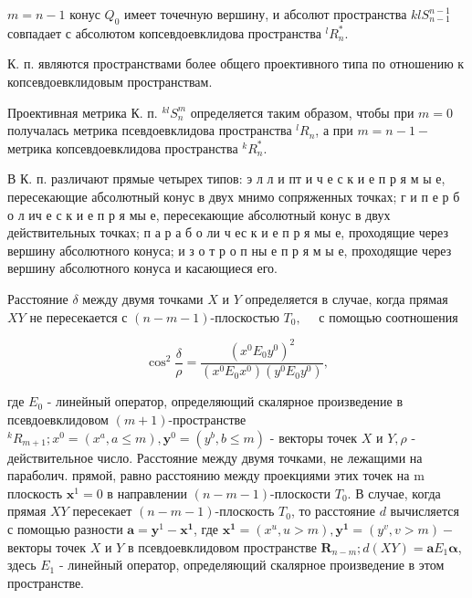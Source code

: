 \documentclass[10pt]{article}
\begin{document}
$m=n-1$ конус $Q_{0}$ имеет точечную вершину, и абсолют пространства $k l S_{n-1}^{n-1}$ совпадает с абсолютом копсевдоевклидова пространства ${ }^{l} R_{n}^{*}$.



К. п. являются пространствами более общего проективного типа по отношению к копсевдоевклидовым пространствам.



Проективная метрика К. п. ${ }^{k l} S_{n}^{m}$ определяется таким образом, чтобы при $m=0$ получалась метрика псевдоевклидова пространства ${ }^{l} R_{n}$, а при $m=n-1-$ метрика копсевдоевклидова пространства ${ }^{k} R_{n}^{*}$.



В К. п. различают прямые четырех типов: э л л и пт и ч е с к и е п р я м ы е, пересекающие абсолютный конус в двух мнимо сопряженных точках; г и п е р б о л ич е с к и е п р я мы е, пересекающие абсолютный конус в двух действительных точках; п а р а б о ли ч ес к и е п р я мы е, проходящие через вершину абсолютного конуса; и з о т р о п ны е п р я м ы е, проходящие через вершину абсолютного конуса и касающиеся его.



Расстояние $\delta$ между двумя точками $X$ и $Y$ определяется в случае, когда прямая $X Y$ не пересекается с $(n-m-1)$-плоскостью $T_{0}, \quad$ с помощью соотношения



\[

\cos ^{2} \frac{\delta}{\rho}=\frac{\left(x^{0} E_{0} y^{0}\right)^{2}}{\left(x^{0} E_{0} x^{0}\right)\left(y^{0} E_{0} y^{0}\right)},

\]



где $E_{0}$ - линейный оператор, определяющий скалярное произведение в псевдоевклидовом $(m+1)$-пространстве ${ }^{k} R_{m+1} ; x^{0}=\left(x^{a}, a \leqslant m\right), \boldsymbol{y}^{0}=\left(y^{b}, b \leqslant m\right)$ - векторы точек $X$ и $Y, \rho$ - действительное число. Расстояние между двумя точками, не лежащими на параболич. прямой, равно расстоянию между проекциями этих точек на $\mathrm{m}$ плоскость $\boldsymbol{x}^{1}=0$ в направлении $(n-m-1)$-плоскости $T_{0}$. В случае, когда прямая $X Y$ пересекает $(n-m-1)$-плоскость $T_{0}$, то расстояние $d$ вычисляется с помощью разности $\boldsymbol{a}=\boldsymbol{y}^{1}-\boldsymbol{x}^{\mathbf{1}}$, где $\boldsymbol{x}^{\mathbf{1}}=\left(x^{u}, u>m\right), \boldsymbol{y}^{\mathbf{1}}=\left(y^{v}, v>m\right)-$ векторы точек $X$ и $Y$ в псевдоевклидовом пространстве $\boldsymbol{R}_{n-m} ; d(X Y)=\boldsymbol{a} E_{1} \boldsymbol{\alpha}$, здесь $E_{1}$ - линейный оператор, определяющий скалярное произведение в этом пространстве.
\end{document}
